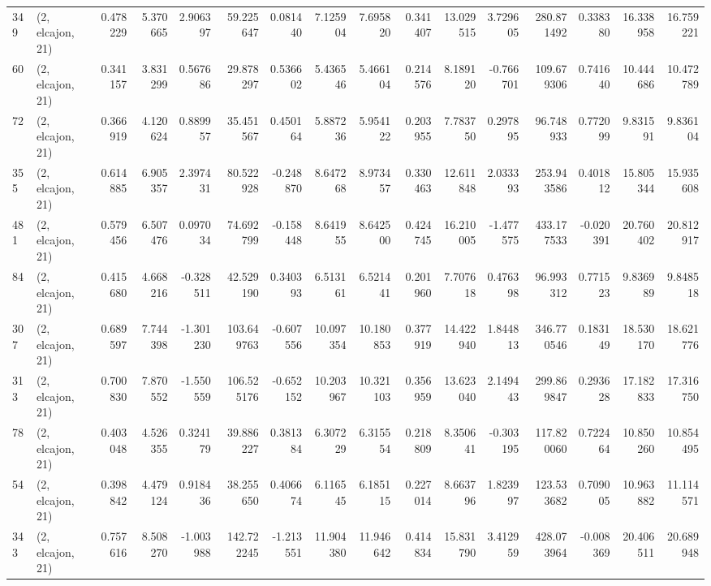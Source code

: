 \begin{tabular}{llrrrrrrrrrrrrrr}
349 &  (2, elcajon, 21) &   0.478229 &   5.370665 &   2.906397 &    59.225647 &   0.081440 &   7.125904 &   7.695820 &  0.341407 &  13.029515 &   3.729605 &   280.871492 &  0.338380 &  16.338958 &  16.759221 \\
60  &  (2, elcajon, 21) &   0.341157 &   3.831299 &   0.567686 &    29.878297 &   0.536602 &   5.436546 &   5.466104 &  0.214576 &   8.189120 &  -0.766701 &   109.679306 &  0.741640 &  10.444686 &  10.472789 \\
72  &  (2, elcajon, 21) &   0.366919 &   4.120624 &   0.889957 &    35.451567 &   0.450164 &   5.887236 &   5.954122 &  0.203955 &   7.783750 &   0.297895 &    96.748933 &  0.772099 &   9.831591 &   9.836104 \\
355 &  (2, elcajon, 21) &   0.614885 &   6.905357 &   2.397431 &    80.522928 &  -0.248870 &   8.647268 &   8.973457 &  0.330463 &  12.611848 &   2.033393 &   253.943586 &  0.401812 &  15.805344 &  15.935608 \\
481 &  (2, elcajon, 21) &   0.579456 &   6.507476 &   0.097034 &    74.692799 &  -0.158448 &   8.641955 &   8.642500 &  0.424745 &  16.210005 &  -1.477575 &   433.177533 & -0.020391 &  20.760402 &  20.812917 \\
84  &  (2, elcajon, 21) &   0.415680 &   4.668216 &  -0.328511 &    42.529190 &   0.340393 &   6.513161 &   6.521441 &  0.201960 &   7.707618 &   0.476398 &    96.993312 &  0.771523 &   9.836989 &   9.848518 \\
307 &  (2, elcajon, 21) &   0.689597 &   7.744398 &  -1.301230 &   103.649763 &  -0.607556 &  10.097354 &  10.180853 &  0.377919 &  14.422940 &   1.844813 &   346.770546 &  0.183149 &  18.530170 &  18.621776 \\
313 &  (2, elcajon, 21) &   0.700830 &   7.870552 &  -1.550559 &   106.525176 &  -0.652152 &  10.203967 &  10.321103 &  0.356959 &  13.623040 &   2.149443 &   299.869847 &  0.293628 &  17.182833 &  17.316750 \\
78  &  (2, elcajon, 21) &   0.403048 &   4.526355 &   0.324179 &    39.886227 &   0.381384 &   6.307229 &   6.315554 &  0.218809 &   8.350641 &  -0.303195 &   117.820060 &  0.722464 &  10.850260 &  10.854495 \\
54  &  (2, elcajon, 21) &   0.398842 &   4.479124 &   0.918436 &    38.255650 &   0.406674 &   6.116545 &   6.185115 &  0.227014 &   8.663796 &   1.823997 &   123.533682 &  0.709005 &  10.963882 &  11.114571 \\
343 &  (2, elcajon, 21) &   0.757616 &   8.508270 &  -1.003988 &   142.722245 &  -1.213551 &  11.904380 &  11.946642 &  0.414834 &  15.831790 &   3.412959 &   428.073964 & -0.008369 &  20.406511 &  20.689948 \\

\end{tabular}
